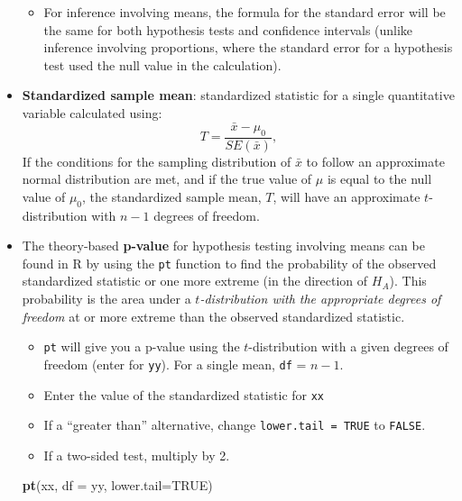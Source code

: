 \documentclass[
]{report}
\newenvironment{Shaded}{\begin{snugshade}}{\end{snugshade}}
\newcommand{\AttributeTok}[1]{\textcolor[rgb]{0.13,0.29,0.53}{#1}}
\newcommand{\ConstantTok}[1]{\textcolor[rgb]{0.56,0.35,0.01}{#1}}
\newcommand{\FunctionTok}[1]{\textcolor[rgb]{0.13,0.29,0.53}{\textbf{#1}}}
\newcommand{\NormalTok}[1]{#1}
\providecommand{\tightlist}{%
  \setlength{\itemsep}{0pt}\setlength{\parskip}{0pt}}
\begin{document}
\begin{itemize}
  \begin{itemize}
  \tightlist
  \item
    For inference involving means, the formula for the standard error will be the same for both hypothesis tests and confidence intervals (unlike inference involving proportions, where the standard error for a hypothesis test used the null value in the calculation).
  \end{itemize}
\item
  \textbf{Standardized sample mean}: standardized statistic for a single quantitative variable calculated using:
  \[
  T = \frac{\bar{x} - \mu_0}{SE(\bar{x})},
  \]
  If the conditions for the sampling distribution of \(\bar{x}\) to follow an approximate normal distribution are met, and if the true value of \(\mu\) is equal to the null value of \(\mu_0\), the standardized sample mean, \(T\), will have an approximate \(t\)-distribution with \(n-1\) degrees of freedom.
\item
  The theory-based \textbf{p-value} for hypothesis testing involving means can be found in R by using the \texttt{pt} function to find the probability of the observed standardized statistic or one more extreme (in the direction of \(H_A\)). This probability is the area under a \emph{\(t\)-distribution with the appropriate degrees of freedom} at or more extreme than the observed standardized statistic.

  \begin{itemize}
  \item
    \texttt{pt} will give you a p-value using the \(t\)-distribution with a given degrees of freedom (enter for \texttt{yy}). For a single mean, \texttt{df} = \(n - 1\).
  \item
    Enter the value of the standardized statistic for \texttt{xx}
  \item
    If a ``greater than'' alternative, change \texttt{lower.tail\ =\ TRUE} to \texttt{FALSE}.
  \item
    If a two-sided test, multiply by 2.
  \end{itemize}

\begin{Shaded}
\begin{Highlighting}[]
\FunctionTok{pt}\NormalTok{(xx, }\AttributeTok{df =}\NormalTok{ yy, }\AttributeTok{lower.tail=}\ConstantTok{TRUE}\NormalTok{)}
\end{Highlighting}
\end{Shaded}
\end{itemize}
\end{document}
